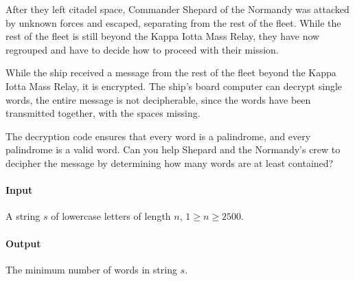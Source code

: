 



\makeheader

After they left citadel space, Commander Shepard of the Normandy was attacked by unknown forces and escaped, separating from the rest of the fleet. While the rest of the fleet is still beyond the Kappa Iotta Mass Relay, they have now regrouped and have to decide how to proceed with their mission.

While the ship received a message from the rest of the fleet beyond the Kappa Iotta Mass Relay, it is encrypted. The ship's board computer can decrypt single words, the entire message is not decipherable, since the words have been transmitted together, with the spaces missing.

The decryption code ensures that every word is a palindrome, and every palindrome is a valid word. Can you help Shepard and the Normandy's crew to decipher the message by determining how many words are at least contained?

\paragraph*{Input}

A string $s$ of lowercase letters of length $n$, $1 \geq n \geq 2500$.

\paragraph*{Output}

The minimum number of words in string $s$.

\begin{samples}
\end{samples}

